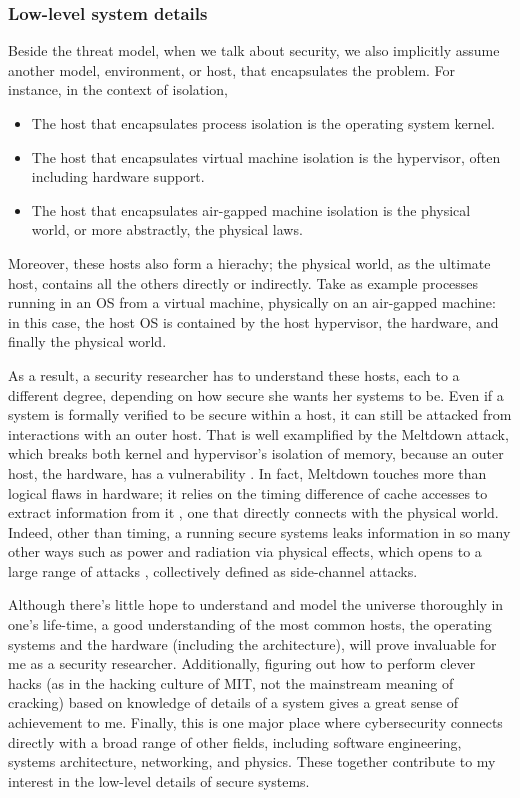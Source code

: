 \documentclass{article}
\begin{document}
\subsubsection{Low-level system details}
Beside the threat model, when we talk about security, we also implicitly assume
another model, environment, or host, that encapsulates the problem. For
instance, in the context of isolation, 
\begin{itemize}
	\item The host that encapsulates process isolation is the operating system
		kernel.
	\item The host that encapsulates virtual machine isolation is the
		hypervisor, often including hardware support.
	\item The host that encapsulates air-gapped machine isolation is the
		physical world, or more abstractly, the physical laws.
\end{itemize}
Moreover, these hosts also form a hierachy; the physical world, as the ultimate
host, contains all the others directly or indirectly. Take as example processes
running in an OS from a virtual machine, physically on an air-gapped machine:
in this case, the host OS is contained by the host hypervisor, the hardware,
and finally the physical world.

As a result, a security researcher has to understand these hosts, each to a
different degree, depending on how secure she wants her systems to be. Even if
a system is formally verified to be secure within a host, it can still be
attacked from interactions with an outer host. That is well examplified by
the Meltdown attack, which breaks both kernel and hypervisor's isolation of
memory, because an outer host, the hardware, has a vulnerability
\cite{meltdown}. In fact, Meltdown touches more than logical flaws in hardware;
it relies on the timing difference of cache accesses to extract information
from it \cite{flush.reload}, one that directly connects with the physical
world. Indeed, other than timing, a running secure systems leaks information in
so many other ways such as power and radiation via physical effects, which
opens to a large range of attacks \cite{side.channel.1, side.channel.2,
side.channel.3, flush.reload}, collectively defined as side-channel attacks.

Although there's little hope to understand and model the universe thoroughly in
one's life-time, a good understanding of the most common hosts, the operating
systems and the hardware (including the architecture), will prove invaluable
for me as a security researcher. Additionally, figuring out how to perform
clever hacks (as in the hacking culture of MIT, not the mainstream meaning of
cracking) based on knowledge of details of a system gives a great sense of
achievement to me. Finally, this is one major place where cybersecurity
connects directly with a broad range of other fields, including software
engineering, systems architecture, networking, and physics.  These together
contribute to my interest in the low-level details of secure systems.
\end{document}
